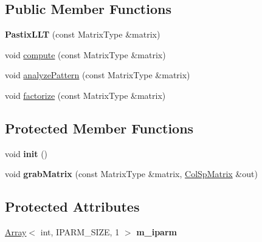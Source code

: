 \subsection*{Public Member Functions}
\begin{DoxyCompactItemize}
\item 
\mbox{\label{class_eigen_1_1_pastix_l_l_t_af0e0af17977bfc585ca85d0b91d7174d}} 
{\bfseries Pastix\+L\+LT} (const Matrix\+Type \&matrix)
\item 
void \mbox{\hyperlink{class_eigen_1_1_pastix_l_l_t_a54fcdef53903851e2d8113a6ed330b5c}{compute}} (const Matrix\+Type \&matrix)
\item 
void \mbox{\hyperlink{class_eigen_1_1_pastix_l_l_t_a671e8444ae2f04db3565e35caa958667}{analyze\+Pattern}} (const Matrix\+Type \&matrix)
\item 
void \mbox{\hyperlink{class_eigen_1_1_pastix_l_l_t_a63dac317804b18a4704a519d7bdfaaff}{factorize}} (const Matrix\+Type \&matrix)
\end{DoxyCompactItemize}
\subsection*{Protected Member Functions}
\begin{DoxyCompactItemize}
\item 
\mbox{\label{class_eigen_1_1_pastix_l_l_t_a496c7de2b4ea6665e1018fd475502a88}} 
void {\bfseries init} ()
\item 
\mbox{\label{class_eigen_1_1_pastix_l_l_t_a90eb65cc498437ca71bcc65ad1645ed6}} 
void {\bfseries grab\+Matrix} (const Matrix\+Type \&matrix, \mbox{\hyperlink{class_eigen_1_1_sparse_matrix}{Col\+Sp\+Matrix}} \&out)
\end{DoxyCompactItemize}
\subsection*{Protected Attributes}
\begin{DoxyCompactItemize}
\item 
\mbox{\label{class_eigen_1_1_pastix_l_l_t_a5cdb7299e33d7f089d9e38f191aed9b9}} 
\mbox{\hyperlink{class_eigen_1_1_array}{Array}}$<$ int, I\+P\+A\+R\+M\+\_\+\+S\+I\+ZE, 1 $>$ {\bfseries m\+\_\+iparm}
\end{DoxyCompactItemize}
